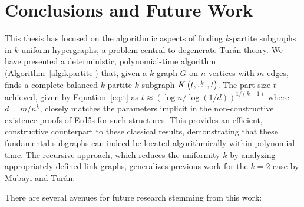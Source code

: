 \section{Conclusions and Future Work}\label{sec:conclusions} %

This thesis has focused on the algorithmic aspects of finding $k$-partite subgraphs in $k$-uniform hypergraphs,
a problem central to degenerate Turán theory.
We have presented a deterministic,
polynomial-time algorithm (Algorithm~\ref{alg:kpartite}) that, given a $k$-graph $G$ on $n$ vertices with $m$ edges,
finds a complete balanced $k$-partite $k$-subgraph $K\left(t, \overset{k}{\dots}, t\right)$.
The part size $t$ achieved, given by Equation~\eqref{eq:t} as $t \approx (\log n / \log(1/d))^{1/(k-1)}$ where $d=m/n^k$,
closely matches the parameters implicit in the non-constructive existence proofs of Erd\H{o}s for such structures.
This provides an efficient, constructive counterpart to these classical results,
demonstrating that these fundamental subgraphs can indeed be located algorithmically within polynomial time.
The recursive approach, which reduces the uniformity $k$ by analyzing appropriately defined link graphs,
generalizes previous work for the $k=2$
case by Mubayi and Turán.

There are several avenues for future research stemming from this work:

